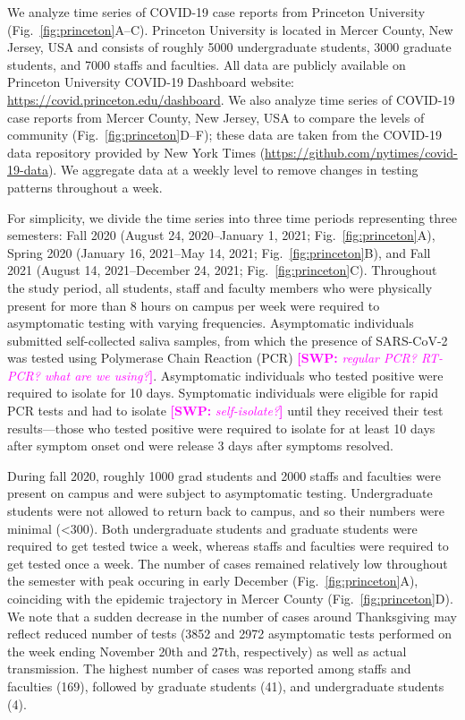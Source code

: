 \documentclass[12pt]{article}
\newcommand{\fref}[1]{Fig.~\ref{fig:#1}}
\newcommand{\comment}[3]{\textcolor{#1}{\textbf{[#2: }\textsl{#3}\textbf{]}}}
\newcommand{\swp}[1]{\comment{magenta}{SWP}{#1}}
\begin{document}
We analyze time series of COVID-19 case reports from Princeton University (\fref{princeton}A--C).
Princeton University is located in Mercer County, New Jersey, USA and consists of roughly 5000 undergraduate students, 3000 graduate students, and 7000 staffs and faculties.
All data are publicly available on Princeton University COVID-19 Dashboard website: \url{https://covid.princeton.edu/dashboard}.
We also analyze time series of COVID-19 case reports from Mercer County, New Jersey, USA to compare the levels of community (\fref{princeton}D--F);
these data are taken from the COVID-19 data repository provided by New York Times (\url{https://github.com/nytimes/covid-19-data}).
We aggregate data at a weekly level to remove changes in testing patterns throughout a week.

For simplicity, we divide the time series into three time periods representing three semesters: Fall 2020 (August 24, 2020--January 1, 2021; \fref{princeton}A), Spring 2020 (January 16, 2021--May 14, 2021; \fref{princeton}B), and Fall 2021 (August 14, 2021--December 24, 2021; \fref{princeton}C).
Throughout the study period, all students, staff and faculty members who were physically present for more than 8 hours on campus per week were required to asymptomatic testing with varying frequencies.
Asymptomatic individuals submitted self-collected saliva samples, from which the presence of SARS-CoV-2 was tested using Polymerase Chain Reaction (PCR) \swp{regular PCR? RT-PCR? what are we using?}.  
Asymptomatic individuals who tested positive were required to isolate for 10 days.
Symptomatic individuals were eligible for rapid PCR tests and had to isolate \swp{self-isolate?} until they received their test results---those who tested positive were required to isolate for at least 10 days after symptom onset ond were release 3 days after symptoms resolved.

During fall 2020, roughly 1000 grad students and 2000 staffs and faculties were present on campus and were subject to asymptomatic testing. 
Undergraduate students were not allowed to return back to campus, and so their numbers were minimal (<300).  
Both undergraduate students and graduate students were required to get tested twice a week, whereas staffs and faculties were required to get tested once a week.
The number of cases remained relatively low throughout the semester with peak occuring in early December (\fref{princeton}A), coinciding with the epidemic trajectory in Mercer County (\fref{princeton}D).
We note that a sudden decrease in the number of cases around Thanksgiving may reflect reduced number of tests (3852 and 2972 asymptomatic tests performed on the week ending November 20th and 27th, respectively) as well as actual transmission.
The highest number of cases was reported among staffs and faculties (169), followed by graduate students (41), and undergraduate students (4).
\end{document}
